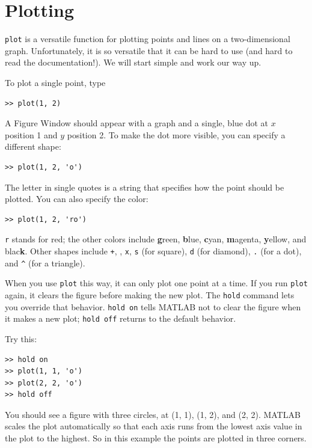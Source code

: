 \documentclass[
]{book}
\begin{document}
\section{Plotting}
\label{sect:plotting}

{\tt plot} is a versatile function for plotting points and lines
on a two-dimensional graph.  Unfortunately, it is so versatile
that it can be hard to use (and hard to read the documentation!).
We will start simple and work our way up.

To plot a single point, type

\begin{verbatim}
>> plot(1, 2)
\end{verbatim}

A {\sf Figure Window} should appear with a graph and a single, blue dot
at $x$ position 1 and $y$ position 2.  To make the dot more visible,
you can specify a different shape:

\begin{verbatim}
>> plot(1, 2, 'o')
\end{verbatim}

The letter in single quotes is a string that specifies how the
point should be plotted.  You can also specify the color:

\begin{verbatim}
>> plot(1, 2, 'ro')
\end{verbatim}

{\tt r} stands for red; the other colors include {\bf g}reen, {\bf
b}lue, {\bf c}yan, {\bf m}agenta, {\bf y}ellow, and blac{\bf k}.
Other shapes include {\tt +},
{\tt *},
{\tt x},
{\tt s} (for square),
{\tt d} (for diamond), 
{\tt .} (for a dot), and
\verb+^+ (for a triangle).

When you use {\tt plot} this way, it can only plot one point at a
time.  If you run {\tt plot} again, it clears the figure before making
the new plot.  The {\tt hold} command lets you override that behavior.
{\tt hold on} tells MATLAB not to clear the figure when it makes a new
plot; {\tt hold off} returns to the default behavior.

Try this:

\begin{verbatim}
>> hold on
>> plot(1, 1, 'o')
>> plot(2, 2, 'o')
>> hold off
\end{verbatim}

You should see a figure with three circles, at (1, 1), (1, 2), and (2, 2).  MATLAB scales
the plot automatically so that each axis runs from the lowest axis value in
the plot to the highest.  So in this example the points are plotted in
three corners.
\end{document}
